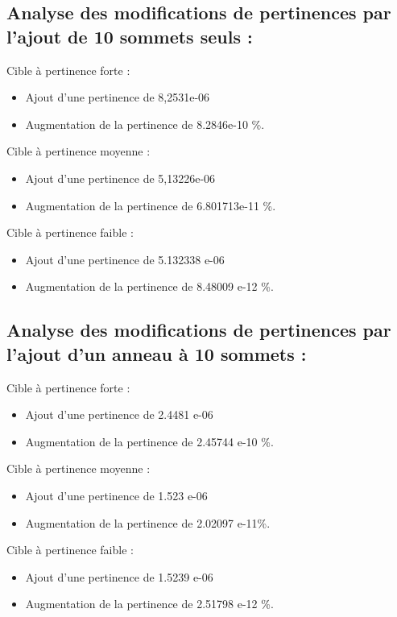 \documentclass[a4paper,11pt]{article}
\begin{document}
	\subsection{Analyse des modifications de pertinences par l'ajout de 10 sommets seuls :}
		Cible à pertinence forte :
		\begin{itemize} 	
			\item Ajout d'une pertinence de 8,2531e-06
			\item Augmentation de la pertinence de 8.2846e-10 \%.
		\end{itemize}
		Cible à pertinence moyenne :
		\begin{itemize} 	
			\item Ajout d'une pertinence de 5,13226e-06
			\item Augmentation de la pertinence de 6.801713e-11 \%.
		\end{itemize}
		Cible à pertinence faible :
		\begin{itemize} 	
			\item Ajout d'une pertinence de 5.132338 e-06
			\item Augmentation de la pertinence de 8.48009 e-12 \%.
		\end{itemize}

	\subsection{Analyse des modifications de pertinences par l'ajout d'un anneau à 10 sommets :}
	Cible à pertinence forte :
		\begin{itemize} 	
			\item Ajout d'une pertinence de 2.4481 e-06
			\item Augmentation de la pertinence de 2.45744 e-10 \%.
		\end{itemize}
		Cible à pertinence moyenne :
		\begin{itemize} 	
			\item Ajout d'une pertinence de 1.523 e-06
			\item Augmentation de la pertinence de 2.02097 e-11\%.
		\end{itemize}
		Cible à pertinence faible :
		\begin{itemize} 	
			\item Ajout d'une pertinence de 1.5239 e-06
			\item Augmentation de la pertinence de 2.51798 e-12 \%.
		\end{itemize}
\end{document}
